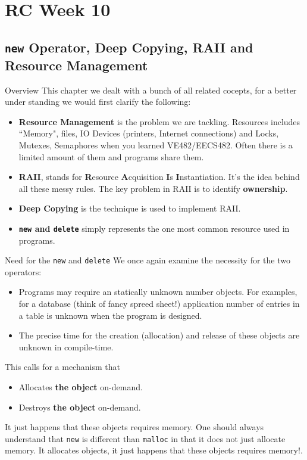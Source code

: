 \section{RC Week 10}
\subsection{\texttt{new} Operator, Deep Copying, RAII and Resource Management}

\begin{frame}{Overview}
This chapter we dealt with a bunch of all related cocepts, for a better under standing we would first clarify the following:
\begin{itemize}
    \item \textbf{Resource Management} is the problem we are tackling. Resources includes ``Memory", files, IO Devices (printers, Internet connections) and Locks, Mutexes, Semaphores when you learned VE482/EECS482. Often there is a limited amount of them and programs share them.
    \item \textbf{RAII}, stands for \textbf{R}esource \textbf{A}cquisition  \textbf{I}s \textbf{I}nstantiation. It's the idea behind all these messy rules. The key problem in RAII is to identify \textbf{ownership}. 
    \item \textbf{Deep Copying} is the technique is used to implement RAII.
    \item \textbf{\texttt{new} and \texttt{delete}} simply represents the one most common resource used in programs.
\end{itemize}
\end{frame}

\begin{frame}{Need for the \texttt{new} and \texttt{delete}}
We once again examine the necessity for the two operators:
\begin{itemize}
    \item Programs may require an statically unknown number objects. For examples, for a database (think of fancy spreed sheet!) application number of entries in a table is unknown when the program is designed.
    \item The precise time for the creation (allocation) and release of these objects are unknown in compile-time.
\end{itemize}
This calls for a mechanism that
\begin{itemize}
    \item Allocates \textbf{the object} on-demand.
    \item Destroys \textbf{the object} on-demand.
\end{itemize}
It just happens that these objects requires memory. One should always understand that \texttt{new} is different than \texttt{malloc} in that it does not just allocate memory. \alert{It allocates objects, it just happens that these objects requires memory!.}
\end{frame}

